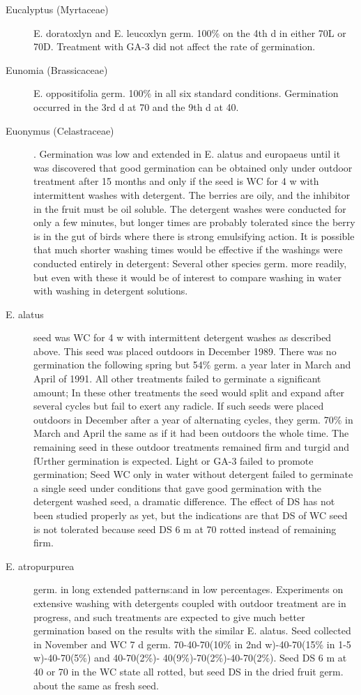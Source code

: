\begin{description}
\item[Eucalyptus (Myrtaceae)] E. doratoxlyn and E. leucoxlyn germ. 100\% on the
4th d in either 70L or 70D. Treatment with GA-3 did not affect the rate of germination.

\item[Eunomia (Brassicaceae)] E. oppositifolia germ. 100\% in all six standard
conditions. Germination occurred in the 3rd d at 70 and the 9th d at 40.

\item[Euonymus (Celastraceae)]. Germination was low and extended in E.
alatus and europaeus until it was discovered that good germination can be obtained
only under outdoor treatment after 15 months and only if the seed is WC for 4 w with
intermittent washes with detergent. The berries are oily, and the inhibitor in the fruit
must be oil soluble. The detergent washes were conducted for only a few minutes, but
longer times are probably tolerated since the berry is in the gut of birds where there is
strong emulsifying action. It is possible that much shorter washing times would be
effective if the washings were conducted entirely in detergent: Several other species
germ. more readily, but even with these it would be of interest to compare washing in
water with washing in detergent solutions.

\item[E. alatus] seed was WC for 4 w with intermittent detergent washes as described
above. This seed was placed outdoors in December 1989. There was no germination
the following spring but 54\% germ. a year later in March and April of 1991. All other
treatments failed to germinate a significant amount; In these other treatments the seed
would split and expand after several cycles but fail to exert any radicle. If such seeds
were placed outdoors in December after a year of alternating cycles, they germ. 70\%
in March and April the same as if it had been outdoors the whole time. The remaining
seed in these outdoor treatments remained firm and turgid and fUrther germination is
expected. Light or GA-3 failed to promote germination; Seed WC only in water without
detergent failed to germinate a single seed under conditions that gave good
germination with the detergent washed seed, a dramatic difference. The effect of DS
has not been studied properly as yet, but the indications are that DS of WC seed is not
tolerated because seed DS 6 m at 70 rotted instead of remaining firm.

\item[E. atropurpurea] germ. in long extended patterns:and in low percentages.
Experiments on extensive washing with detergents coupled with outdoor treatment are
in progress, and such treatments are expected to give much better germination based
on the results with the similar E. alatus. Seed collected in November and WC 7 d
germ. 70-40-70(10\% in 2nd w)-40-70(15\% in 1-5 w)-40-70(5\%) and 40-70(2\%)-
40(9\%)-70(2\%)-40-70(2\%). Seed DS 6 m at 40 or 70 in the WC state all rotted, but
seed DS in the dried fruit germ. about the same as fresh seed.


\end{description}
